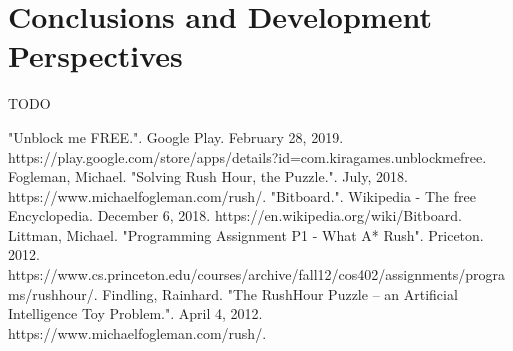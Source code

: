 \documentclass[conference]{IEEEtran}
\begin{document}
\section{Conclusions and Development Perspectives}
TODO

\begin{thebibliography}{00}
    
 "Unblock me FREE.". Google Play. February 28, 2019. https://play.google.com/store/apps/details?id=com.kiragames.unblockmefree.
 Fogleman, Michael. "Solving Rush Hour, the Puzzle.". July, 2018. https://www.michaelfogleman.com/rush/.
 "Bitboard.". Wikipedia - The free Encyclopedia. December 6, 2018. https://en.wikipedia.org/wiki/Bitboard.
 Littman, Michael. "Programming Assignment P1 - What A* Rush". Priceton. 2012. https://www.cs.princeton.edu/courses/archive/fall12/cos402/assignments/programs/rushhour/.
 Findling, Rainhard. "The RushHour Puzzle – an Artificial Intelligence Toy Problem.". April 4, 2012. https://www.michaelfogleman.com/rush/.
\end{thebibliography}
\end{document}
